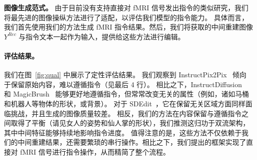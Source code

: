 \textbf{图像生成范式。} 由于目前没有支持直接对 fMRI 信号发出指令的类似研究，我们将最先进的图像操纵方法进行了适配，以评估我们模型的指令能力。
具体而言，我们首先使用我们的方法生成 fMRI 指令结果。然后，我们将获取的中间重建图像 $Y^{Rec}$ 与指令文本一起作为输入，提供给这些方法进行编辑。

\paragraph{评估结果。} 我们在图~\ref{fig:qual} 中展示了定性评估结果。
我们观察到 InstructPix2Pix~\cite{brooks2023instructpix2pix} 倾向于保留原始内容，难以遵循指令（见最后 4 行）。
相比之下，InstructDiffusion~\cite{geng2023instructdiffusion} 和 MagicBrush~\cite{zhang2024magicbrush} 能够更好地遵循指令，但常常改变无关的属性（例如，诸如马桶和机器人等物体的形状，或背景）。
对于 SDEdit~\cite{meng2021sdedit}，它在保留无关区域方面同样面临挑战，并且生成的图像质量较差。
相反，我们的方法在内容保留与遵循指令之间取得了平衡（请见女人的姿势和仙人掌的形状），我们推测这归功于双流架构，其中中间特征能够持续地影响指令进度。
值得注意的是，这些方法不仅依赖于我们的中间重建结果，还需要繁琐的串行操作。相比之下，我们提出的框架实现了直接对 fMRI 信号进行指令操作，从而精简了整个流程。

